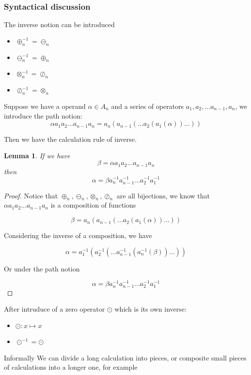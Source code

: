 \documentclass{article}
\newtheorem{lemma}{Lemma}
\begin{document}
\subsubsection{Syntactical discussion}\label{sec:syntactical}

The inverse notion can be introduced
\begin{itemize}
    \item $\oplus_n^{-1} = \ominus_n$
    \item $\ominus_n^{-1} = \oplus_n$
    \item $\otimes_n^{-1} = \oslash_n$
    \item $\oslash_n^{-1} = \otimes_n$
\end{itemize}

Suppose we have a operand $\alpha \in A_n $ and a series of operators $a_1, a_2, ... a_{n-1}, a_n$,
we introduce the path notion:
$$\alpha a_1 a_2 ... a_{n-1} a_n = a_n( a_{n-1}( ... a_2( a_1(\alpha) ) ... ) )$$

Then we have the calculation rule of inverse.

\begin{lemma}
\label{lemma:inverserule}
If we have
$$\beta = \alpha a_1 a_2 ... a_{n-1} a_n$$
then
$$\alpha = \beta a_n^{-1} a_{n-1}^{-1} ... a_2^{-1} a_1^{-1}$$
\end{lemma}

\begin{proof}
Notice that $\oplus_n, \ominus_n, \otimes_n, \oslash_n$ are all bijections, we know that $\alpha a_1 a_2 ... a_{n-1} a_n$ is a composition of functions

$$\beta = a_n( a_{n-1}( ... a_2( a_1(\alpha) ) ... ) )$$

Considering the inverse of a composition, we have

$$\alpha = a_1^{-1}( a_2^{-1}( ... a_{n-1}^{-1}( a_n^{-1}(\beta) ) ... ) )$$

Or under the path notion

$$\alpha = \beta a_n^{-1} a_{n-1}^{-1} ... a_2^{-1} a_1^{-1}$$

\qedhere
\end{proof}

After intruduce of a zero operator $\odot$ which is its own inverse:
\begin{itemize}
    \item $\odot: x \mapsto x$
    \item $\odot^{-1} = \odot$
\end{itemize}

Informally We can divide a long calculation into pieces, or composite small pieces of calculations into a longer one,
for example
\end{document}
